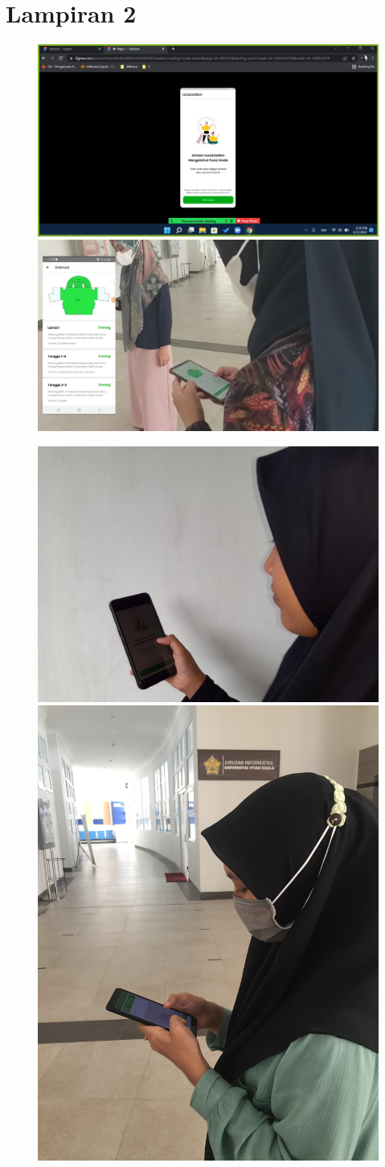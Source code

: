\vspace{2cm}




\chapter*{Lampiran 2}
\begin{figure}[htp]
  \centering
  \includegraphics[width=.4\textwidth]{gambar/lampiran/umux1.jpeg}\quad
  \includegraphics[width=.4\textwidth]{gambar/lampiran/umux5.jpeg}

  \medskip

  \includegraphics[width=.4\textwidth]{gambar/lampiran/umux3.jpeg}\quad
  \includegraphics[width=.4\textwidth]{gambar/lampiran/umux4.JPG}


\end{figure}
